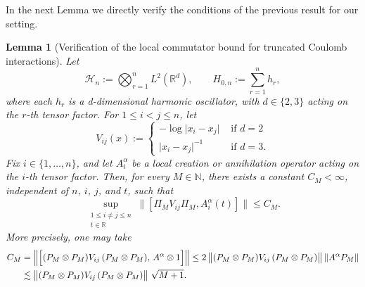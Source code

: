 \documentclass[11pt]{amsart}
\newcommand{\1}{\mathbbm{1}}
\theoremstyle{plain}
\newtheorem{lemma}[theorem]{Lemma}
\theoremstyle{definition}
\theoremstyle{remark}
\numberwithin{equation}{section}
\begin{document}
In the next Lemma we directly verify the conditions of the previous result for our setting. 
\begin{lemma}[Verification of the local commutator bound for truncated Coulomb interactions]
\label{lem:local-commutator-harmonic-cutoff}
Let
\[
\mathcal H_n:=\bigotimes_{r=1}^n L^2(\mathbb R^d),\qquad
H_{0,n}:=\sum_{r=1}^n h_r,
\]
where each \(h_r\) is a d-dimensional harmonic oscillator, with $d \in \{2,3\}$ acting on the \(r\)-th tensor factor.
For \(1\le i<j\le n\), let
\[
V_{ij}(x):=\begin{cases}
-\log \vert x_i-x_j \vert &\text{ if }d=2\\
    \vert x_i-x_j \vert^{-1} &\text{ if }d=3.
\end{cases}
\]
Fix \(i\in\{1,\dots,n\}\), and let \(A_i^\alpha\) be a local creation or annihilation operator acting on the \(i\)-th tensor factor. Then, for every \(M\in\mathbb N\), there exists a constant \(C_M<\infty\), independent of \(n\), \(i\), \(j\), and \(t\), such that
\[
\sup_{\substack{1\le i\neq j\le n\\ t\in\mathbb R}}
\bigl\|[\Pi_MV_{ij}\Pi_M,A_i^\alpha(t)]\bigr\|
\le C_M.
\]
More precisely, one may take
\[\begin{split}
C_M&=
\Bigl\|
\Bigl[(P_M\otimes P_M)V_{ij}\,(P_M\otimes P_M),\,A^\alpha\otimes 1\Bigr]
\Bigr\|\le 2\,\bigl\|(P_M\otimes P_M)V_{ij}\,(P_M\otimes P_M)\bigr\|\,\|A^\alpha P_M\|\\
&\lesssim \bigl\|(P_M\otimes P_M)V_{ij}\,(P_M\otimes P_M)\bigr\|\ \sqrt{M+1}.
\end{split}
\]
\end{lemma}
\end{document}

